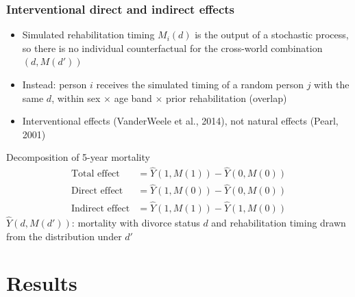 \documentclass[t,20pt]{beamer}
\newcommand{\ct}[1]{{\color{BiBBlau80}(#1)}}                        %
\begin{document}
\begin{bibframe}
  \frametitle{Interventional direct and indirect effects}
  \begin{itemize}
    \item Simulated rehabilitation timing $M_i(d)$ is the output of a stochastic process, so there is no individual counterfactual for the cross-world combination $(d, M(d'))$
    \item Instead: person $i$ receives the simulated timing of a random person $j$ with the same $d$, within sex $\times$ age band $\times$ prior rehabilitation (overlap)
    \item[$\rightarrow$] Interventional effects \ct{VanderWeele et al., 2014}, not natural effects \ct{Pearl, 2001}
  \end{itemize}
  \begin{block}{Decomposition of 5-year mortality}
    \vspace{-0.4cm}
    \begin{align*}
      \text{Total effect} &= \hat Y(1,M(1)) - \hat Y(0,M(0))\\
      \text{Direct effect} &= \hat Y(1,M(0)) - \hat Y(0,M(0))\\
      \text{Indirect effect} &= \hat Y(1,M(1)) - \hat Y(1,M(0))
    \end{align*}
    \vspace{-0.4cm}
    {\small $\hat Y(d,M(d'))$: mortality with divorce status $d$ and rehabilitation timing drawn from the distribution under $d'$}
  \end{block}
\end{bibframe}

\section{Results}
\end{document}
